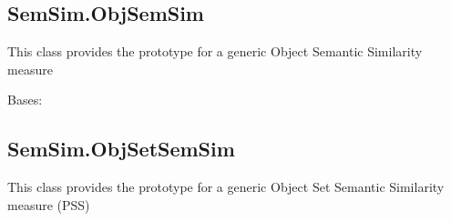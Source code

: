\documentclass[letterpaper,10pt,english]{sphinxmanual}
\begin{document}
\subsection{SemSim.ObjSemSim}
\label{fastsemsim.SemSim:semsim-objsemsim}\label{fastsemsim.SemSim:module-fastsemsim.SemSim.ObjSemSim}
This class provides the prototype for a generic Object Semantic Similarity measure

\begin{fulllineitems}
\label{fastsemsim.SemSim:fastsemsim.SemSim.ObjSemSim.ObjSemSim}
Bases: 

\begin{fulllineitems}
\label{fastsemsim.SemSim:fastsemsim.SemSim.ObjSemSim.ObjSemSim.SemSim}
\end{fulllineitems}


\end{fulllineitems}



\subsection{SemSim.ObjSetSemSim}
\label{fastsemsim.SemSim:module-fastsemsim.SemSim.ObjSetSemSim}\label{fastsemsim.SemSim:semsim-objsetsemsim}
This class provides the prototype for a generic Object Set Semantic Similarity measure (PSS)

\begin{fulllineitems}
\label{fastsemsim.SemSim:fastsemsim.SemSim.ObjSetSemSim.ObjSetSemSim}~

\begin{fulllineitems}
\label{fastsemsim.SemSim:fastsemsim.SemSim.ObjSetSemSim.ObjSetSemSim.SemSim}
\end{fulllineitems}


\end{fulllineitems}
\end{document}
